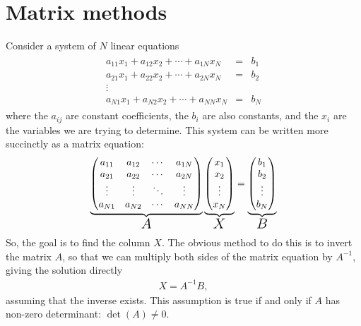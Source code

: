 \chapter{Matrix methods} \label{ch:matrices}



Consider a system of $N$ linear equations
\begin{align*}
\begin{array}{ccc}
a_{11} x_1 + a_{12} x_2 + \cdots + a_{1N} x_N & = & b_1 \\
a_{21} x_1 + a_{22} x_2 + \cdots + a_{2N} x_N & = & b_2 \\
\vdots & & \\
a_{N1} x_1 + a_{N2} x_2 + \cdots + a_{NN} x_N & = & b_N
\end{array}
\end{align*}
where the $a_{ij}$ are constant coefficients, the $b_i$ are also constants, and the $x_i$ are the variables we are trying to determine. This system can be written more succinctly as a matrix equation:
\begin{align*}
\underbrace{
\begin{pmatrix}
a_{11} & a_{12} & \cdots & a_{1N} \\
a_{21} & a_{22} & \cdots & a_{2N} \\
\vdots & \vdots & \ddots & \vdots \\
a_{N1} & a_{N2} & \cdots & a_{NN}
\end{pmatrix}
}_\mathlarger{\mathlarger{\mathlarger{\mathlarger{A}}}}
\underbrace{
\begin{pmatrix}
x_{1} \\
x_{2} \\
\vdots \\
x_{N}
\end{pmatrix}
}_\mathlarger{\mathlarger{\mathlarger{\mathlarger{X}}}}
=
\underbrace{
\begin{pmatrix}
b_{1} \\
b_{2} \\
\vdots \\
b_{N}
\end{pmatrix}
}_\mathlarger{\mathlarger{\mathlarger{\mathlarger{B}}}}
\end{align*}
So, the goal is to find the column $X$. The obvious method to do this is to invert the matrix $A$, so that we can multiply both sides of the matrix equation by $A^{-1}$, giving the solution directly
\begin{align*}
X = A^{-1}B,
\end{align*}
assuming that the inverse exists. This assumption is true if and only if $A$ has non-zero determinant: $\det(A)\neq 0$.

